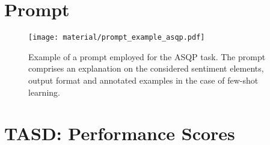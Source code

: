 


\onecolumn 

\section{Prompt}
\label{appendix:prompt-example}

\begin{figure*}[!h]
    \centering
    \texttt{[image: material/prompt\_example\_asqp.pdf]}
    \caption{Example of a prompt employed for the ASQP task. The prompt comprises an explanation on the considered sentiment elements, output format and annotated examples in the case of few-shot learning.}
\end{figure*}
\label{figure:prompt-example}


\newpage

\section{TASD: Performance Scores}
\label{appendix:performance-tasd}

